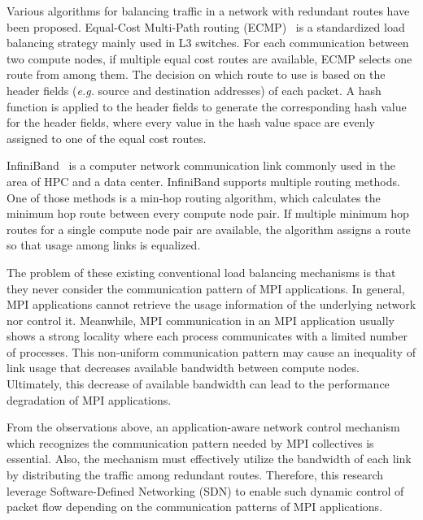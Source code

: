 Various algorithms for balancing traffic in a network with redundant routes
have been proposed. Equal-Cost Multi-Path routing (ECMP)~\autocite{ecmp} is a
standardized load balancing strategy mainly used in L3 switches. For each
communication between two compute nodes, if multiple equal cost routes are
available, ECMP selects one route from among them. The decision on which route
to use is based on the header fields (\emph{e.g.} source and destination
addresses) of each packet. A hash function is applied to the header fields to
generate the corresponding hash value for the header fields, where every value
in the hash value space are evenly assigned to one of the equal cost routes.

InfiniBand~\autocite{Buyya2009} is a computer network communication link
commonly used in the area of HPC and a data center. InfiniBand supports
multiple routing methods. One of those methods is a min-hop routing
algorithm, which calculates the minimum hop route between every
compute node pair. If multiple minimum hop routes for a single
compute node pair are available, the algorithm assigns a route so that
usage among links is equalized.

The problem of these existing conventional load balancing mechanisms is
that they never consider the communication pattern of MPI applications. In
general, MPI applications cannot retrieve the usage information of the
underlying network nor control it. Meanwhile, MPI communication in an MPI
application usually shows a strong locality where each process communicates
with a limited number of processes. This non-uniform communication pattern may
cause an inequality of link usage that decreases available bandwidth between
compute nodes. Ultimately, this decrease of available bandwidth can lead to
the performance degradation of MPI applications.

From the observations above, an application-aware network control mechanism
which recognizes the communication pattern needed by MPI collectives is
essential. Also, the mechanism must effectively utilize the bandwidth of each
link by distributing the traffic among redundant routes. Therefore, this
research leverage Software-Defined Networking (SDN) to enable such dynamic
control of packet flow depending on the communication patterns of MPI
applications.

